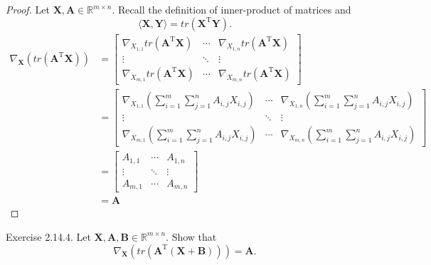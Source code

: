 \documentclass{article}
\theoremstyle{plain}
\begin{document}
\begin{proof}
	Let
	\begin{math}
		\bm{X} , \bm{A} \in \mathbb{R}^{m \times n} .
	\end{math}
	Recall the definition of inner-product of matrices and
	\begin{equation*}
		\langle \bm{X} , \bm{Y} \rangle = tr(\bm{X}^\mathrm{T} \bm{Y}) .
	\end{equation*}
	\begin{equation*}
		\begin{split}
			\nabla_{\bm{X}} (tr(\bm{A}^{\mathrm{T}} \bm{X})) &=
			\begin{bmatrix}
				\nabla_{X_{1,1}} tr(\bm{A}^\mathrm{T} \bm{X}) & \cdots & \nabla_{X_{1,n}} tr(\bm{A}^\mathrm{T} \bm{X}) \\
				\vdots & \ddots & \vdots \\
				\nabla_{X_{m,1}} tr(\bm{A}^\mathrm{T} \bm{X}) & \cdots & \nabla_{X_{m,n}} tr(\bm{A}^\mathrm{T} \bm{X})
			\end{bmatrix} \\
			&=
			\begin{bmatrix}
				\nabla_{X_{1,1}} \left( \sum_{i=1}^m \sum_{j=1}^n A_{i,j} X_{i,j} \right) & \cdots & \nabla_{X_{1,n}} \left( \sum_{i=1}^m \sum_{j=1}^n A_{i,j} X_{i,j} \right) \\
				\vdots & \ddots & \vdots \\
				\nabla_{X_{m,1}} \left( \sum_{i=1}^m \sum_{j=1}^n A_{i,j} X_{i,j} \right) & \cdots & \nabla_{X_{m,n}} \left( \sum_{i=1}^m \sum_{j=1}^n A_{i,j} X_{i,j} \right)
			\end{bmatrix} \\
			&=
			\begin{bmatrix}
				A_{1,1} & \cdots & A_{1,n} \\
				\vdots & \ddots & \vdots \\
				A_{m,1} & \cdots & A_{m,n}
			\end{bmatrix} \\
			&= \bm{A}
		\end{split}
	\end{equation*}
\end{proof}


\begin{itembox}[l]{Exercise 2.14.4.}
	Let
	\begin{math}
		\bm{X} , \bm{A} , \bm{B} \in \mathbb{R}^{m \times n} .
	\end{math}
	Show that
	\begin{equation}
		\nabla_{\bm{X}} (tr(\bm{A}^\mathrm{T} (\bm{X} + \bm{B}))) = \bm{A} .
	\end{equation}
\end{itembox}
\end{document}
